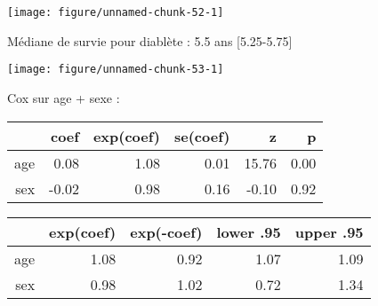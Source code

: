 \documentclass[11pt,a4paper]{article}\usepackage[]{graphicx}\usepackage[]{color}
\makeatletter
\def\maxwidth{ %
  \ifdim\Gin@nat@width>\linewidth
    \linewidth
  \else
    \Gin@nat@width
  \fi
}
\newenvironment{knitrout}{}{} %
\makeatother
\begin{document}
\begin{knitrout}
\color{fgcolor}
\texttt{[image: figure/unnamed-chunk-52-1]} 

\end{knitrout}

Médiane de survie pour diablète : 5.5 ans [5.25-5.75]

\begin{knitrout}
\color{fgcolor}
\texttt{[image: figure/unnamed-chunk-53-1]} 

\end{knitrout}

Cox sur age + sexe :
\begin{table}[H]
\centering
\begin{tabular}{rrrrrr}
  \hline
 & coef & exp(coef) & se(coef) & z & p \\ 
  \hline
age & 0.08 & 1.08 & 0.01 & 15.76 & 0.00 \\ 
  sex & -0.02 & 0.98 & 0.16 & -0.10 & 0.92 \\ 
   \hline
\end{tabular}
\end{table}
\begin{table}[H]
\centering
\begin{tabular}{rrrrr}
  \hline
 & exp(coef) & exp(-coef) & lower .95 & upper .95 \\ 
  \hline
age & 1.08 & 0.92 & 1.07 & 1.09 \\ 
  sex & 0.98 & 1.02 & 0.72 & 1.34 \\ 
   \hline
\end{tabular}
\end{table}
\end{document}
